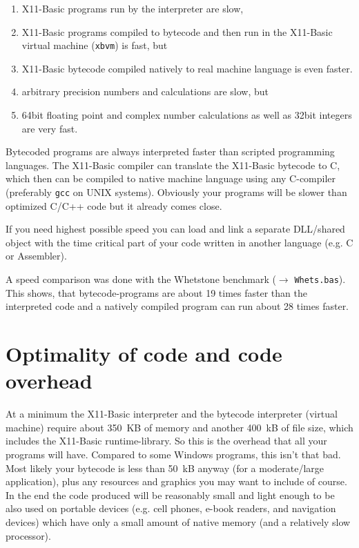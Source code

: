 \begin{enumerate}
\item X11-Basic programs run by the interpreter are slow,
\item X11-Basic programs compiled to bytecode and then run in the X11-Basic 
virtual machine (\verb|xbvm|) is fast, but
\item X11-Basic bytecode compiled natively to real machine language 
is even faster.
\item arbitrary precision numbers and calculations are slow, but 
\item 64bit floating point and complex number calculations as well as 
32bit integers are very fast.
\end{enumerate}

Bytecoded programs are always interpreted faster than scripted programming 
languages. The X11-Basic compiler can translate the X11-Basic bytecode to C, 
which then can be compiled to native machine language using any C-compiler 
(preferably \verb|gcc| on UNIX systems). Obviously your programs will be slower
than optimized C/C++ code but it already comes close.

If you need highest possible speed you can load and link a separate
DLL/shared object with the time critical part of your code written in another 
language (e.g. C or Assembler). 

A speed comparison was done with the Whetstone benchmark ($\longrightarrow$
\verb|Whets.bas|).  This shows, that bytecode-programs are about 19 times faster
than the interpreted code and a natively compiled program can run about 28 times
faster.

\section*{Optimality of code and code overhead}

At a minimum the X11-Basic interpreter and the bytecode interpreter  (virtual
machine) require about 350~KB of memory and another 400~kB of file  size, which
includes the X11-Basic runtime-library.  So this is the overhead that all your
programs will have. Compared to some Windows programs, this isn't that bad. Most
likely your bytecode is less than 50~kB anyway (for a moderate/large
application), plus any resources and graphics you may want to include of course.
In the end the code  produced will be reasonably small and light enough to be
also used on  portable devices (e.g. cell phones, e-book readers, and navigation
devices) which have only  a small amount of native memory (and a relatively slow
processor).

